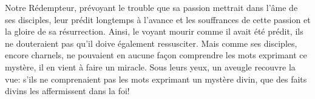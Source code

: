 Notre Rédempteur,
		prévoyant le trouble que sa passion mettrait dans l'âme de ses disciples,
	leur prédit longtemps à l'avance
		et les souffrances de cette passion et la gloire de sa résurrection.
Ainsi, le voyant mourir comme il avait été prédit,
	ils ne douteraient pas qu'il doive également ressusciter.
Mais comme ses disciples, encore charnels,
		ne pouvaient en aucune façon comprendre les mots exprimant ce mystère,
	il en vient à faire un miracle.
Sous leurs yeux, un aveugle recouvre la vue:
	s'ils ne comprenaient pas les mots exprimant un mystère divin,
	que des faits divins les affermissent dans la foi!
